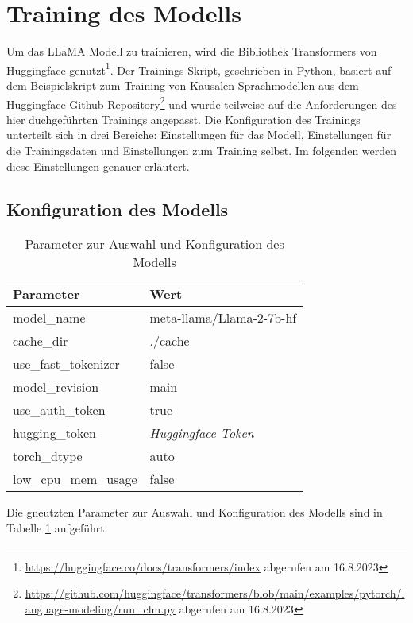 \section{Training des Modells}
Um das LLaMA Modell zu trainieren, wird die Bibliothek Transformers von Huggingface genutzt\footnote{\url{https://huggingface.co/docs/transformers/index} abgerufen am 16.8.2023}.
Der Trainings-Skript, geschrieben in Python, basiert auf dem Beispielskript zum Training von Kausalen Sprachmodellen aus dem Huggingface Github Repository\footnote{\url{https://github.com/huggingface/transformers/blob/main/examples/pytorch/language-modeling/run_clm.py} abgerufen am 16.8.2023} und wurde teilweise auf die Anforderungen des hier duchgeführten Trainings angepasst.
Die Konfiguration des Trainings unterteilt sich in drei Bereiche: Einstellungen für das Modell, Einstellungen für die Trainingsdaten und Einstellungen zum Training selbst.
Im folgenden werden diese Einstellungen genauer erläutert.
\subsection{Konfiguration des Modells}
\begin{table}
    \centering
    \begin{tabular}{ll}
        \toprule
        \textbf{Parameter} & \textbf{Wert} \\
        \midrule
        model\_name & meta-llama/Llama-2-7b-hf \\
        cache\_dir & ./cache \\
        use\_fast\_tokenizer & false \\
        model\_revision & main \\
        use\_auth\_token & true \\
        hugging\_token & \textit{Huggingface Token} \\
        torch\_dtype & auto \\
        low\_cpu\_mem\_usage & false \\
    \end{tabular}
    \caption{Parameter zur Auswahl und Konfiguration des Modells}\label{tab:model-config}
\end{table}
Die gneutzten Parameter zur Auswahl und Konfiguration des Modells sind in Tabelle \ref{tab:model-config} aufgeführt.\\

